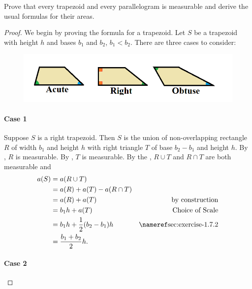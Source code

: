 \documentclass{report}
\begin{document}
\section{}%
\label{sec:exercise-1.7.3}

Prove that every trapezoid and every parallelogram is measurable and derive the
  usual formulas for their areas.

\begin{proof}

  We begin by proving the formula for a trapezoid.
  Let $S$ be a trapezoid with height $h$ and bases $b_1$ and $b_2$, $b_1 < b_2$.
  There are three cases to consider:

  \begin{figure}[h]
    \includegraphics[width=\textwidth]{trapezoid-cases}
    \centering
  \end{figure}

  \paragraph{Case 1}%

    Suppose $S$ is a right trapezoid.
    Then $S$ is the union of non-overlapping rectangle $R$ of width $b_1$ and
      height $h$ with right triangle $T$ of base $b_2 - b_1$ and height $h$.
    By , $R$ is measurable.
    By , $T$ is measurable.
    By the , $R \cup T$ and $R \cap T$ are both
      measurable and
      \begin{align*}
        a(S)
          & = a(R \cup T) \\
          & = a(R) + a(T) - a(R \cap T) \\
          & = a(R) + a(T) & \text{by construction} \\
          & = b_1h + a(T) & \text{Choice of Scale} \\
          & = b_1h + \frac{1}{2}(b_2 - b_1)h & \textref{sec:exercise-1.7.2} \\
          & = \frac{b_1 + b_2}{2}h.
      \end{align*}

  \paragraph{Case 2}%


\end{proof}
\end{document}
